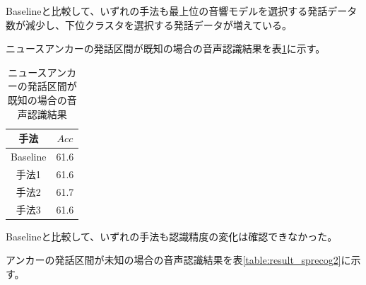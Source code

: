 Baselineと比較して、いずれの手法も最上位の音響モデルを選択する発話データ数が減少し、下位クラスタを選択する発話データが増えている。\\

\par
ニュースアンカーの発話区間が既知の場合の音声認識結果を表\ref{table:result_sprecog1}に示す。

\begin{table}[H]
  \begin{center}
    \caption{ニュースアンカーの発話区間が既知の場合の音声認識結果 \label{table:result_sprecog1}}
    \begin{tabular}{|c||c|} \hline
     手法  & $Acc$  \\ \hline
     Baseline  & 61.6 \\ \hline
     手法1  & 61.6 \\ \hline
     手法2  & 61.7 \\ \hline
     手法3  & 61.6  \\ \hline
    \end{tabular}
  \end{center}
\end{table}

Baselineと比較して、いずれの手法も認識精度の変化は確認できなかった。

\vspace{0.2in}  \par
アンカーの発話区間が未知の場合の音声認識結果を表\ref{table:result_sprecog2}に示す。

